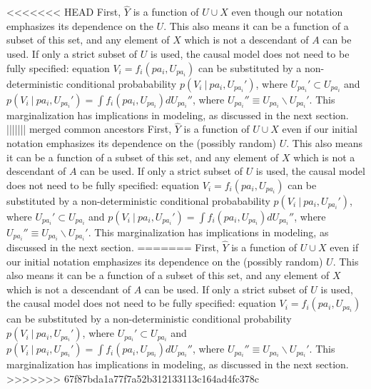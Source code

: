 <<<<<<< HEAD
First, $\hat Y$ is a function of $U \cup X$ even though our notation emphasizes its dependence on the $U$. This also means it can be a function of a subset of this set, and any element of $X$ which is not a descendant of $A$ can be used. If only a strict subset of $U$ is used, the causal model does not need to be fully specified: equation $V_i = f_i(pa_i, U_{pa_i})$ can be substituted by a non-deterministic conditional probabability $p(V_i\ |\ pa_i, U_{pa_i}')$, where $U_{pa_i}' \subset U_{pa_i}$ and $p(V_i\ |\ pa_i, U_{pa_i}') = \int f_i(pa_i, U_{pa_i}) d U_{pa_i}''$, where $U_{pa_i}'' \equiv U_{pa_i} \backslash U_{pa_i}'$. This marginalization has implications in modeling, as discussed in the next section.
||||||| merged common ancestors
First, $\hat Y$ is a function of $U \cup X$ even if our initial notation emphasizes its dependence on the (possibly random) $U$. This also means it can be a function of a subset of this set, and any element of $X$ which is not a descendant of $A$ can be used. If only a strict subset of $U$ is used, the causal model does not need to be fully specified: equation $V_i = f_i(pa_i, U_{pa_i})$ can be substituted by a non-deterministic conditional probabability $p(V_i\ |\ pa_i, U_{pa_i}')$, where $U_{pa_i}' \subset U_{pa_i}$ and $p(V_i\ |\ pa_i, U_{pa_i}') = \int f_i(pa_i, U_{pa_i}) d U_{pa_i}''$, where $U_{pa_i}'' \equiv U_{pa_i} \backslash U_{pa_i}'$. This marginalization has implications in modeling, as discussed in the next section.
=======
First, $\hat Y$ is a function of $U \cup X$ even if our initial notation emphasizes its dependence on the (possibly random) $U$. This also means it can be a function of a subset of this set, and any element of $X$ which is not a descendant of $A$ can be used. If only a strict subset of $U$ is used, the causal model does not need to be fully specified: equation $V_i = f_i(pa_i, U_{pa_i})$ can be substituted by a non-deterministic conditional probability $p(V_i\ |\ pa_i, U_{pa_i}')$, where $U_{pa_i}' \subset U_{pa_i}$ and $p(V_i\ |\ pa_i, U_{pa_i}') = \int f_i(pa_i, U_{pa_i}) d U_{pa_i}''$, where $U_{pa_i}'' \equiv U_{pa_i} \backslash U_{pa_i}'$. This marginalization has implications in modeling, as discussed in the next section.
>>>>>>> 67f87bda1a77f7a52b312133113c164ad4fc378c

